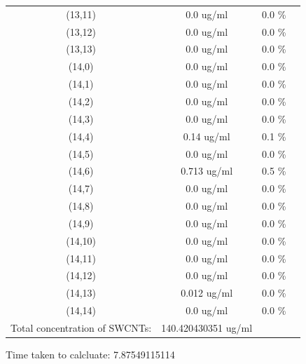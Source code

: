\documentclass{article}
\begin{document}
\begin{tabular}{c c c c}
(13,11)&        0.0 ug/ml        &0.0 \%\\
(13,12)&        0.0 ug/ml        &0.0 \%\\
(13,13)&        0.0 ug/ml        &0.0 \%\\
(14,0)&        0.0 ug/ml        &0.0 \%\\
(14,1)&        0.0 ug/ml        &0.0 \%\\
(14,2)&        0.0 ug/ml        &0.0 \%\\
(14,3)&        0.0 ug/ml        &0.0 \%\\
(14,4)&        0.14 ug/ml        &0.1 \%\\
(14,5)&        0.0 ug/ml        &0.0 \%\\
(14,6)&        0.713 ug/ml        &0.5 \%\\
(14,7)&        0.0 ug/ml        &0.0 \%\\
(14,8)&        0.0 ug/ml        &0.0 \%\\
(14,9)&        0.0 ug/ml        &0.0 \%\\
(14,10)&        0.0 ug/ml        &0.0 \%\\
(14,11)&        0.0 ug/ml        &0.0 \%\\
(14,12)&        0.0 ug/ml        &0.0 \%\\
(14,13)&        0.012 ug/ml        &0.0 \%\\
(14,14)&        0.0 ug/ml        &0.0 \%\\
Total concentration of SWCNTs: &140.420430351 ug/ml\\

\end{tabular}Time taken to calcluate: 7.87549115114
\end{document}
